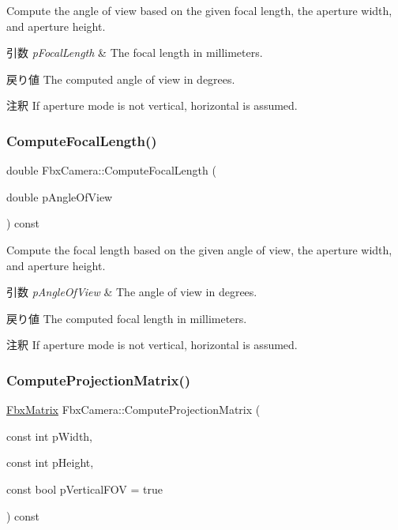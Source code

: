 Compute the angle of view based on the given focal length, the aperture width, and aperture height. 
\begin{DoxyParams}{引数}
{\em p\+Focal\+Length} & The focal length in millimeters. \\
\hline
\end{DoxyParams}
\begin{DoxyReturn}{戻り値}
The computed angle of view in degrees. 
\end{DoxyReturn}
\begin{DoxyRemark}{注釈}
If aperture mode is not vertical, horizontal is assumed. 
\end{DoxyRemark}
\mbox{\label{class_fbx_camera_aeb7c4720e64f1c247a0089943f521dc6}} 
\subsubsection{\texorpdfstring{Compute\+Focal\+Length()}{ComputeFocalLength()}}
{\footnotesize\ttfamily double Fbx\+Camera\+::\+Compute\+Focal\+Length (\begin{DoxyParamCaption}\item[{double}]{p\+Angle\+Of\+View }\end{DoxyParamCaption}) const}

Compute the focal length based on the given angle of view, the aperture width, and aperture height. 
\begin{DoxyParams}{引数}
{\em p\+Angle\+Of\+View} & The angle of view in degrees. \\
\hline
\end{DoxyParams}
\begin{DoxyReturn}{戻り値}
The computed focal length in millimeters. 
\end{DoxyReturn}
\begin{DoxyRemark}{注釈}
If aperture mode is not vertical, horizontal is assumed. 
\end{DoxyRemark}
\mbox{\label{class_fbx_camera_a1d591f5fa59e93139cc1901b3ab92d21}} 
\subsubsection{\texorpdfstring{Compute\+Projection\+Matrix()}{ComputeProjectionMatrix()}}
{\footnotesize\ttfamily \hyperlink{class_fbx_matrix}{Fbx\+Matrix} Fbx\+Camera\+::\+Compute\+Projection\+Matrix (\begin{DoxyParamCaption}\item[{const int}]{p\+Width,  }\item[{const int}]{p\+Height,  }\item[{const bool}]{p\+Vertical\+F\+OV = {\ttfamily true} }\end{DoxyParamCaption}) const}

